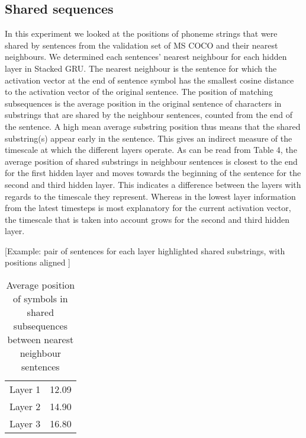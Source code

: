 \subsection{Shared sequences}
In this experiment we looked at the positions of phoneme strings that were shared by sentences from the validation set of MS COCO and their nearest neighbours. We determined each sentences' nearest neighbour for each hidden layer in {\sc Stacked GRU}. The nearest neighbour is the sentence for which the activation vector at the end of sentence symbol has the smallest cosine distance to the activation vector of the original sentence. The position of matching subsequences is the average position in the original sentence of characters in substrings that are shared by the neighbour sentences, counted from the end of the sentence. A high mean average substring position thus means that the shared substring(s) appear early in the sentence. This gives an indirect measure of the timescale at which the different layers operate. 
As can be read from Table 4, the average position of shared substrings in neighbour sentences is closest to the end for the first hidden layer and moves towards the beginning of the sentence for the second and third hidden layer. This indicates a difference between the layers with regards to the timescale they represent. Whereas in the lowest layer information from the latest timesteps is most explanatory for the current activation vector, the timescale that is taken into account grows for the second and third hidden layer. 

[Example: pair of sentences for each layer
highlighted shared substrings, with positions aligned ]

\begin{table}[]
	\centering
	\begin{tabular}{cc}
		Layer 1 & 12.09 \\
		Layer 2 & 14.90 \\
		Layer 3 & 16.80
	\end{tabular}
	\caption{Average position of symbols in shared subsequences between nearest neighbour sentences}
\end{table}